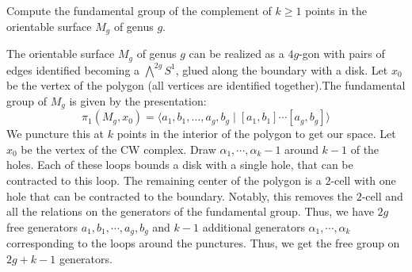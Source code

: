 \documentclass[12pt]{article}
\begin{document}



\begin{problem}{1}
    Compute the fundamental group of the complement of $k \geq 1$ points in the orientable surface $M_g$ of genus $g$.
\end{problem}
\begin{solution}
    The orientable surface $M_g$ of genus $g$ can be realized as a $4g$-gon with pairs of edges identified becoming a $\bigwedge^{2g} S^1$, glued along the boundary with a disk. Let $x_0$ be the vertex of the polygon (all vertices are identified together).The fundamental group of $M_g$ is given by the presentation:
    \[
        \pi_1(M_g, x_0) = \langle a_1, b_1, \ldots, a_g, b_g \mid [a_1, b_1]\cdots[a_g, b_g] \rangle
    \]  
    We puncture this at $k$ points in the interior of the polygon to get our space. \bbni  
    Let $x_0$ be the vertex of the CW complex. Draw $\alpha_1, \cdots, \alpha_k-1$ around $k-1$ of the holes. Each of these loops bounds a disk with a single hole, that can be contracted to this loop. The remaining center of the polygon is a $2$-cell with one hole that can be contracted to the boundary. Notably, this removes the $2$-cell and all the relations on the generators of the fundamental group. Thus, we have $2g$ free generators $a_1, b_1, \cdots, a_g, b_g$ and $k-1$ additional generators $\alpha_1, \cdots, \alpha_k$ corresponding to the loops around the punctures. Thus, we get the free group on $2g+k-1$ generators. 
\end{solution}
\newpage 
\end{document}
